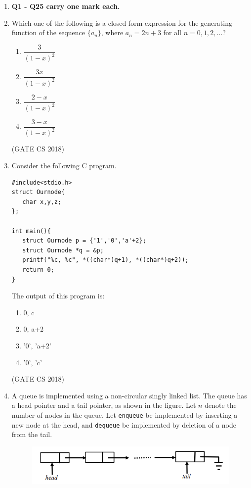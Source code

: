 \documentclass[12pt]{article}
\begin{document}
\begin{enumerate}

\item[] \textbf{Q1 - Q25 carry one mark each.}

\item Which one of the following is a closed form expression for the generating function of the sequence $\{a_n\}$, where $a_n = 2n + 3$ for all $n = 0, 1, 2, \dots$?

\begin{multicols}{4}
\begin{enumerate}
\item $\dfrac{3}{(1-x)^2}$
\item $\dfrac{3x}{(1-x)^2}$
\item $\dfrac{2-x}{(1-x)^2}$
\item $\dfrac{3-x}{(1-x)^2}$
\end{enumerate}
\end{multicols}
(GATE CS 2018)

\item Consider the following C program.

\begin{verbatim}
#include<stdio.h>
struct Ournode{
   char x,y,z;
};

int main(){
   struct Ournode p = {'1','0','a'+2};
   struct Ournode *q = &p;
   printf("%c, %c", *((char*)q+1), *((char*)q+2));
   return 0;
}
\end{verbatim}

The output of this program is:

\begin{multicols}{4}
\begin{enumerate}
\item 0, c
\item 0, a+2
\item '0', 'a+2'
\item '0', 'c'
\end{enumerate}
\end{multicols}
(GATE CS 2018)

\item A queue is implemented using a non-circular singly linked list. The queue has a head pointer and a tail pointer, as shown in the figure. Let $n$ denote the number of nodes in the queue. Let \texttt{enqueue} be implemented by inserting a new node at the head, and \texttt{dequeue} be implemented by deletion of a node from the tail.

\begin{figure}[H]
    \centering
    \includegraphics[width=0.5\columnwidth]{figs/ass6_a_q3.png}
    \caption{}
    \label{fig:placeholder}
\end{figure}


\end{enumerate}
\end{document}

